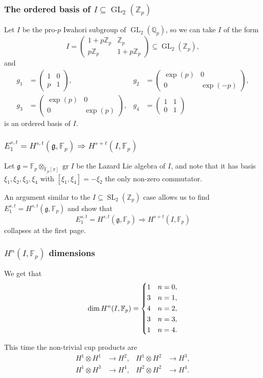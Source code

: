 \documentclass{beamer}
\newcommand*\Z{\mathbb{Z}}
\newcommand*\Q{\mathbb{Q}}
\newcommand*\F{\mathbb{F}}
\DeclareMathOperator{\GL}{GL} %
\DeclareMathOperator{\SL}{SL} %
\DeclareMathOperator{\gr}{gr} %
\newcommand*{\lie}[1]{\mathfrak{#1}} %
\newcommand*\pmat[1]{\begin{pmatrix} #1 \end{pmatrix}}
\begin{document}
\begin{frame}
  \frametitle{The ordered basis of $I \subseteq \GL_{2}(\Z_{p})$}

  Let $I$ be the pro-$p$ Iwahori subgroup of $\GL_{2}(\Q_{p})$, so we can take $I$ of the form
  \[
    I = \pmat{ 1+p\Z_{p} & \Z_{p} \\ p\Z_{p} & 1+p\Z_{p} } \subseteq \GL_{2}(\Z_{p}),
  \]
  and
  \begin{align*}
    g_{1} &= \pmat{ 1&0\\p&1 }, & g_{2} &= \pmat{ \exp(p)&0\\0&\exp(-p) }, \\
    g_{3} &= \pmat{ \exp(p)&0\\0&\exp(p) }, & g_{4} &= \pmat{ 1&1\\0&1 }
  \end{align*}
  is an ordered basis of $I$.
\end{frame}

\begin{frame}
  \frametitle{$E_{1}^{s,t} = H^{s,t}(\lie{g},\F_{p}) \Longrightarrow H^{s+t}(I,\F_{p})$}

  Let $\lie{g} = \F_{p} \otimes_{\F_{p}[\pi]} \gr I$ be the Lazard Lie algebra of $I$, and note that it has basis $\xi_{1},\xi_{2},\xi_{3},\xi_{4}$ with $[\xi_{1},\xi_{4}] = -\xi_{2}$ the only non-zero commutator.

  \pause

  An argument similar to the $I \subseteq \SL_{2}(\Z_{p})$ case allows us to find $E_{1}^{s,t} = H^{s,t}(\lie{g},\F_{p})$ and show that
  \[
    E_{1}^{s,t} = H^{s,t}(\lie{g},\F_{p}) \Longrightarrow H^{s+t}(I,\F_{p})
  \]
  collapses at the first page.
\end{frame}

\begin{frame}
  \frametitle{$H^{n}(I,\F_{p})$ dimensions}

  We get that
  \begin{equation*}
    \dim H^{n}(I,\F_{p}) =
    \begin{dcases}
      1 & n=0, \\
      3 & n=1, \\
      4 & n=2, \\
      3 & n=3, \\
      1 & n=4.
    \end{dcases}
  \end{equation*}

  This time the non-trivial cup products are
  \begin{align*}
    H^{1} \otimes H^{1} &\to H^{2}, & H^{1} \otimes H^{2} &\to H^{3}, \\
    H^{1} \otimes H^{3} &\to H^{4}, & H^{2} \otimes H^{2} &\to H^{4}.
  \end{align*}
\end{frame}
\end{document}
